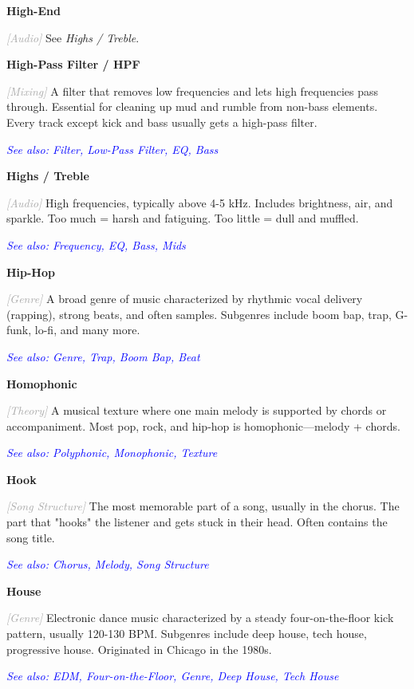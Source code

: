 \documentclass[11pt,letterpaper]{article}
\newcommand{\term}[1]{\textbf{\large\color{purple}#1}}
\newcommand{\category}[1]{\textcolor{darkgray}{\textit{\small [#1]}}}
\newcommand{\seealso}[1]{\textcolor{blue}{\textit{See also: #1}}}
\newenvironment{termdef}[1]
  {\noindent\term{#1}\par\nopagebreak}
  {\par\vspace{0.3em}}
\begin{document}
\begin{termdef}{High-End}
\category{Audio}
See \textit{Highs / Treble}.
\end{termdef}

\begin{termdef}{High-Pass Filter / HPF}
\category{Mixing}
A filter that removes low frequencies and lets high frequencies pass through. Essential for cleaning up mud and rumble from non-bass elements. Every track except kick and bass usually gets a high-pass filter.

\seealso{Filter, Low-Pass Filter, EQ, Bass}
\end{termdef}

\begin{termdef}{Highs / Treble}
\category{Audio}
High frequencies, typically above 4-5 kHz. Includes brightness, air, and sparkle. Too much = harsh and fatiguing. Too little = dull and muffled.

\seealso{Frequency, EQ, Bass, Mids}
\end{termdef}

\begin{termdef}{Hip-Hop}
\category{Genre}
A broad genre of music characterized by rhythmic vocal delivery (rapping), strong beats, and often samples. Subgenres include boom bap, trap, G-funk, lo-fi, and many more.

\seealso{Genre, Trap, Boom Bap, Beat}
\end{termdef}

\begin{termdef}{Homophonic}
\category{Theory}
A musical texture where one main melody is supported by chords or accompaniment. Most pop, rock, and hip-hop is homophonic—melody + chords.

\seealso{Polyphonic, Monophonic, Texture}
\end{termdef}

\begin{termdef}{Hook}
\category{Song Structure}
The most memorable part of a song, usually in the chorus. The part that "hooks" the listener and gets stuck in their head. Often contains the song title.

\seealso{Chorus, Melody, Song Structure}
\end{termdef}

\begin{termdef}{House}
\category{Genre}
Electronic dance music characterized by a steady four-on-the-floor kick pattern, usually 120-130 BPM. Subgenres include deep house, tech house, progressive house. Originated in Chicago in the 1980s.

\seealso{EDM, Four-on-the-Floor, Genre, Deep House, Tech House}
\end{termdef}
\end{document}
